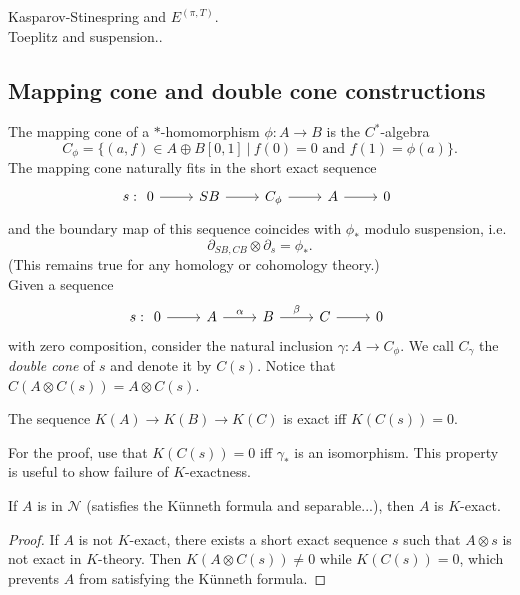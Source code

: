 Kasparov-Stinespring and $E^{(\pi,T)}$.\\
Toeplitz and suspension..

\subsection*{Mapping cone and double cone constructions}

The mapping cone of a $*$-homomorphism $\phi: A \rightarrow B$ is the $C^*$-algebra 
\[C_\phi =\{ (a,f) \in A\oplus B[0,1] \ | \ f(0)= 0 \text{ and } f(1)=\phi(a) \}.\]
The mapping cone naturally fits in the short exact sequence 
\[s: \begin{tikzcd} 0 \arrow{r} & SB \arrow{r} & C_\phi \arrow{r} & A \arrow{r} & 0\end{tikzcd}\] 
and the boundary map of this sequence coincides with $\phi_*$ modulo suspension, i.e.
\[ \partial_{SB,CB} \otimes \partial_s = \phi_*.\]
(This remains true for any homology or cohomology theory.)\\

Given a sequence \[s: \begin{tikzcd} 0 \arrow{r} & A \arrow{r}{\alpha} & B \arrow{r}{\beta} & C \arrow{r} & 0\end{tikzcd}\] 
with zero composition, consider the natural inclusion $\gamma : A \rightarrow C_\phi$. We call $C_\gamma$ the \textit{double cone }of $s$ and denote it by $C(s)$. Notice that $C(A\otimes C(s)) = A \otimes C(s)$.

\begin{prop}
The sequence $K(A)\rightarrow K(B) \rightarrow K(C)$ is exact iff $K(C(s))=0$.
\end{prop}  

For the proof, use that $K(C(s))=0$ iff $\gamma_*$ is an isomorphism. This property is useful to show failure of $K$-exactness. 

\begin{cor}
If $A$ is in $\mathcal N$ (satisfies the K\"{u}nneth formula and separable...), then $A$ is $K$-exact. 
\end{cor}

\begin{proof}
If $A$ is not $K$-exact, there exists a short exact sequence $s$ such that $A\otimes s$ is not exact in $K$-theory. Then $K(A\otimes C(s))\neq 0$ while $K(C(s))=0$, which prevents $A$ from satisfying the K\"{u}nneth formula.
\end{proof}


